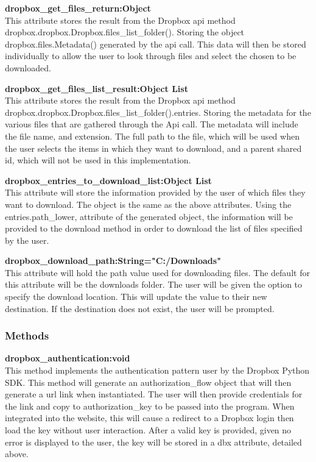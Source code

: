 \textbf{dropbox\_get\_files\_return:Object} \\
    This attribute stores the result from the Dropbox api method dropbox.dropbox.Dropbox.files\_list\_folder(). Storing the object 
    dropbox.files.Metadata() generated by the api call. This data will then be stored individually to allow the user to look through 
    files and select the chosen to be downloaded.

\textbf{dropbox\_get\_files\_list\_result:Object List} \\
    This attribute stores the result from the Dropbox api method dropbox.dropbox.Dropbox.files\_list\_folder().entries. Storing the metadata for 
    the various files that are gathered through the Api call. The metadata will include the file name, and extension. The full path to the file, 
    which will be used when the user selects the items in which they want to download, and a parent shared id, which will not be used in this 
    implementation.

\textbf{dropbox\_entries\_to\_download\_list:Object List} \\
    This attribute will store the information provided by the user of which files they want to download. The object is the same as the above 
    attributes. Using the entries.path\_lower, attribute of the generated object, the information will be provided to the download method in 
    order to download the list of files specified by the user.

\textbf{dropbox\_download\_path:String="C:/Downloads"} \\
    This attribute will hold the path value used for downloading files. The default for this attribute will be the downloads folder. The user 
    will be given the option to specify the download location. This will update the value to their new destination. If the destination does 
    not exist, the user will be prompted.

\subsubsection{Methods}
\textbf{dropbox\_authentication:void} \\
    This method implements the authentication pattern user by the Dropbox Python SDK. This method will generate an authorization\_flow object
    that will then generate a url link when instantiated. The user will then provide credentials for the link and copy to authorization\_key 
    to be passed into the program. When integrated into the website, this will cause a redirect to a Dropbox login then load the key without 
    user interaction. After a valid key is provided, given no error is displayed to the user, the key will be stored in a dbx attribute, detailed 
    above.  

